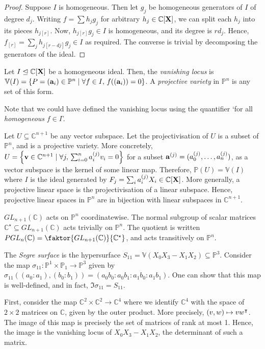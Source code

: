 \begin{proof}
    Suppose \( I \) is homogeneous.
    Then let \( g_j \) be homogeneous generators of \( I \) of degree \( d_j \).
    Writing \( f = \sum h_j g_j \) for arbitrary \( h_j \in \mathbb C[\vb X] \), we can split each \( h_j \) into its pieces \( h_{j[r]} \).
    Now, \( h_{j[r]} g_j \in I \) is homogeneous, and its degree is \( rd_j \).
    Hence, \( f_{[r]} = \sum_j h_{j[r-dj]} g_j \in I \) as required.
    The converse is trivial by decomposing the generators of the ideal.
\end{proof}
\begin{definition}
    Let \( I \trianglelefteq \mathbb C[\vb X] \) be a homogeneous ideal.
    Then, the \emph{vanishing locus} is \( \mathbb V(I) = \qty{P = (\vb a_i) \in \mathbb P^n \mid \forall f \in I,\, f((\vb a_i)) = 0} \).
    A \emph{projective variety} in \( \mathbb P^n \) is any set of this form.
\end{definition}
Note that we could have defined the vanishing locus using the quantifier `for all \emph{homogeneous} \( f \in I \)'.
\begin{example}
    Let \( U \subseteq \mathbb C^{n+1} \) be any vector subspace.
    Let the projectivisation of \( U \) is a subset of \( \mathbb P^n \), and is a projective variety.
    More concretely, \( U = \qty{\vb v \in \mathbb C^{n+1} \mid \forall j,\, \sum_{i=0}^n a_i^{(j)} v_i = 0} \) for a subset \( \vb a^{(j)} = (a_0^{(j)}, \dots, a_n^{(j)}) \), as a vector subspace is the kernel of some linear map.
    Therefore, \( \mathbb P(U) = \mathbb V(I) \) where \( I \) is the ideal generated by \( F_j = \sum_i a^{(j)}_i X_i \in \mathbb C[\vb X] \).
    More generally, a projective linear space is the projectivisation of a linear subspace.
    Hence, projective linear spaces in \( \mathbb P^n \) are in bijection with linear subspaces in \( \mathbb C^{n+1} \).
\end{example}
\( GL_{n+1}(\mathbb C) \) acts on \( \mathbb P^n \) coordinatewise.
The normal subgroup of scalar matrices \( \mathbb C^\star \subseteq GL_{n+1}(\mathbb C) \) acts trivially on \( \mathbb P^n \).
The quotient is written \( PGL_n(\mathbb C) = \faktor{GL_{n+1}(\mathbb C)}{\mathbb C^\star} \), and acts transitively on \( \mathbb P^n \).
\begin{example}
    The \emph{Segre surface} is the hypersurface \( S_{11} = \mathbb V(X_0X_3 - X_1X_2) \subseteq \mathbb P^3 \).
    Consider the map \( \sigma_{11} \colon \mathbb P^1 \times \mathbb P_1 \to \mathbb P^3 \) given by \( \sigma_{11}((a_0 : a_1), (b_0 : b_1)) = (a_0 b_0 : a_0 b_1 : a_1 b_0 : a_1 b_1) \).
    One can show that this map is well-defined, and in fact, \( \Im \sigma_{11} = S_{11} \).

    First, consider the map \( \mathbb C^2 \times \mathbb C^2 \to \mathbb C^4 \) where we identify \( \mathbb C^4 \) with the space of \( 2 \times 2 \) matrices on \( \mathbb C \), given by the outer product.
    More precisely, \( (v,w) \mapsto vw^\intercal \).
    The image of this map is precisely the set of matrices of rank at most 1.
    Hence, the image is the vanishing locus of \( X_0 X_3 - X_1 X_2 \), the determinant of such a matrix.
\end{example}
